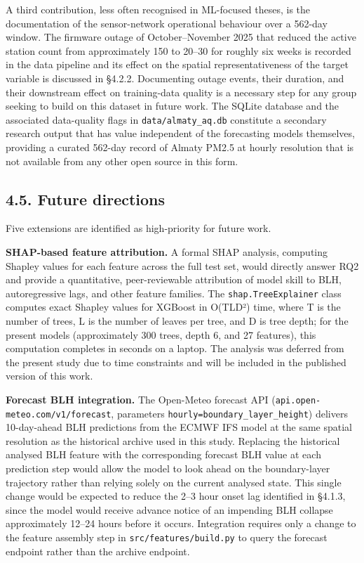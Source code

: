 A third contribution, less often recognised in ML-focused theses, is the documentation of the sensor-network operational behaviour over a 562-day window. The firmware outage of October--November 2025 that reduced the active station count from approximately 150 to 20--30 for roughly six weeks is recorded in the data pipeline and its effect on the spatial representativeness of the target variable is discussed in §4.2.2. Documenting outage events, their duration, and their downstream effect on training-data quality is a necessary step for any group seeking to build on this dataset in future work. The SQLite database and the associated data-quality flags in \texttt{data/almaty\_aq.db} constitute a secondary research output that has value independent of the forecasting models themselves, providing a curated 562-day record of Almaty PM2.5 at hourly resolution that is not available from any other open source in this form.

\subsection{4.5. Future directions}\label{future-directions}

Five extensions are identified as high-priority for future work.

\textbf{SHAP-based feature attribution.} A formal SHAP analysis, computing Shapley values for each feature across the full test set, would directly answer RQ2 and provide a quantitative, peer-reviewable attribution of model skill to BLH, autoregressive lags, and other feature families. The \texttt{shap.TreeExplainer} class computes exact Shapley values for XGBoost in O(TLD²) time, where T is the number of trees, L is the number of leaves per tree, and D is tree depth; for the present models (approximately 300 trees, depth 6, and 27 features), this computation completes in seconds on a laptop. The analysis was deferred from the present study due to time constraints and will be included in the published version of this work.

\textbf{Forecast BLH integration.} The Open-Meteo forecast API (\texttt{api.open-meteo.com/v1/forecast}, parameters \texttt{hourly=boundary\_layer\_height}) delivers 10-day-ahead BLH predictions from the ECMWF IFS model at the same spatial resolution as the historical archive used in this study. Replacing the historical analysed BLH feature with the corresponding forecast BLH value at each prediction step would allow the model to look ahead on the boundary-layer trajectory rather than relying solely on the current analysed state. This single change would be expected to reduce the 2--3 hour onset lag identified in §4.1.3, since the model would receive advance notice of an impending BLH collapse approximately 12--24 hours before it occurs. Integration requires only a change to the feature assembly step in \texttt{src/features/build.py} to query the forecast endpoint rather than the archive endpoint.

